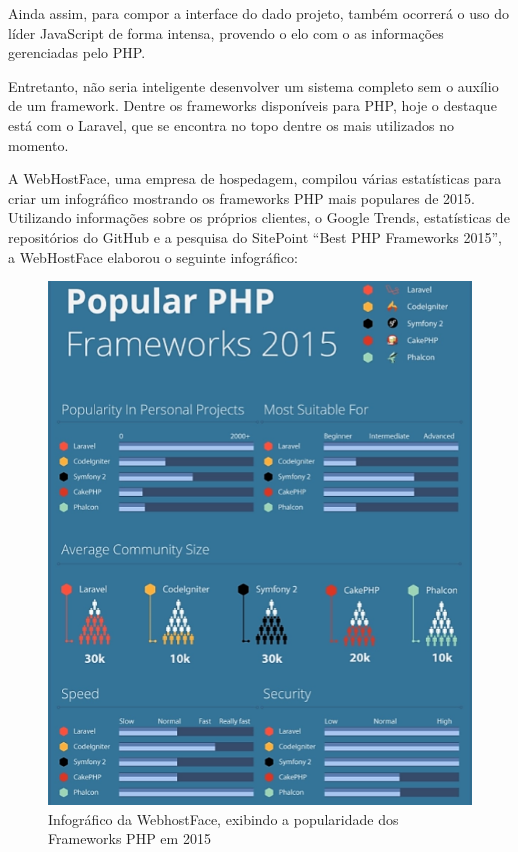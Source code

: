 Ainda assim, para compor a interface do dado projeto, também ocorrerá o uso do líder JavaScript de forma intensa, provendo o elo com o as informações gerenciadas pelo PHP.


Entretanto, não seria inteligente desenvolver um sistema completo sem o auxílio de um framework. Dentre os frameworks disponíveis para PHP, hoje o destaque está com o Laravel, que se encontra no topo dentre os mais utilizados no momento. 


A WebHostFace, uma empresa de hospedagem, compilou várias estatísticas para criar um infográfico mostrando os frameworks PHP mais populares de 2015. Utilizando informações sobre os próprios clientes, o Google Trends, estatísticas de repositórios do GitHub e a pesquisa do SitePoint “Best PHP Frameworks 2015”, a WebHostFace elaborou o seguinte infográfico: 

\begin{figure}
	\label{fig:graficoWebhostface}
	\includegraphics[width=1\textwidth]{img/infografico_webhostface}
	\caption{Infográfico da WebhostFace, exibindo a popularidade dos Frameworks PHP em 2015}
\end{figure}

